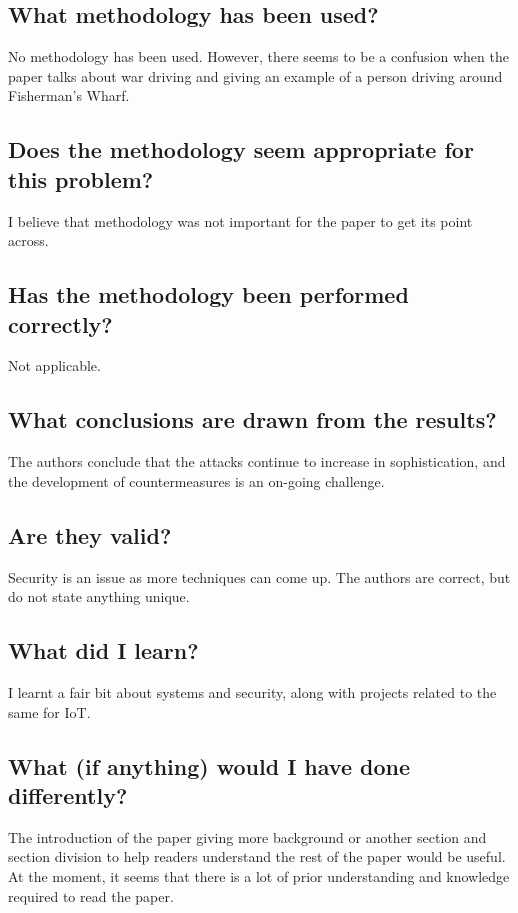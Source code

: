\documentclass[11pt,a4paper]{article}
\begin{document}
\subsection*{What methodology has been used?}
No methodology has been used. However, there seems to be a confusion when the paper talks about war driving and giving an example of a person driving around Fisherman’s Wharf.

\subsection*{Does the methodology seem appropriate for this problem?}
I believe that methodology was not important for the paper to get its point across.

\subsection*{Has the methodology been performed correctly?}
Not applicable.

\subsection*{What conclusions are drawn from the results?}
The authors conclude that the attacks continue to increase in sophistication, and the development of countermeasures is an on-going challenge.

\subsection*{Are they valid?}
Security is an issue as more techniques can come up. The authors are correct, but do not state anything unique.

\subsection*{What did I learn?}
I learnt a fair bit about systems and security, along with projects related to the same for IoT. 
\subsection*{What (if anything) would I have done differently?}
The introduction of the paper giving more background or another section and section division to help readers understand the rest of the paper would be useful. At the moment, it seems that there is a lot of prior understanding and knowledge required to read the paper.
\end{document}
